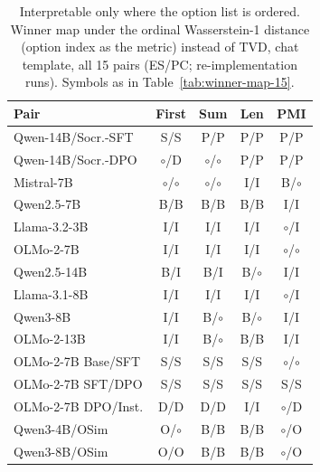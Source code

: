 \begin{table}[t]
\centering\scriptsize
\setlength{\tabcolsep}{3pt}
\begin{tabular}{@{}lcccc@{}}
\toprule
Pair & First & Sum & Len & PMI \\
\midrule
Qwen-14B/Socr.-SFT & S/S & P/P & P/P & P/P \\
Qwen-14B/Socr.-DPO & $\circ$/D & $\circ$/$\circ$ & P/P & P/P \\
Mistral-7B & $\circ$/$\circ$ & $\circ$/$\circ$ & I/I & B/$\circ$ \\
Qwen2.5-7B & B/B & B/B & B/B & I/I \\
Llama-3.2-3B & I/I & I/I & I/I & $\circ$/I \\
OLMo-2-7B & I/I & I/I & I/I & $\circ$/$\circ$ \\
Qwen2.5-14B & B/I & B/I & B/$\circ$ & I/I \\
Llama-3.1-8B & I/I & I/I & I/I & $\circ$/I \\
Qwen3-8B & I/I & B/$\circ$ & B/$\circ$ & I/I \\
OLMo-2-13B & I/I & B/$\circ$ & B/B & I/I \\
OLMo-2-7B Base/SFT & S/S & S/S & S/S & $\circ$/$\circ$ \\
OLMo-2-7B SFT/DPO & S/S & S/S & S/S & S/S \\
OLMo-2-7B DPO/Inst. & D/D & D/D & I/I & $\circ$/D \\
Qwen3-4B/OSim & O/$\circ$ & B/B & B/B & $\circ$/O \\
Qwen3-8B/OSim & O/O & B/B & B/B & $\circ$/O \\
\bottomrule
\end{tabular}
\caption{Interpretable only where the option list is ordered. Winner map under the ordinal Wasserstein-1 distance (option index as the metric) instead of TVD, chat template, all 15 pairs (ES/PC; re-implementation runs). Symbols as in Table~\ref{tab:winner-map-15}.}
\label{tab:w1-winner-map}
\end{table}
